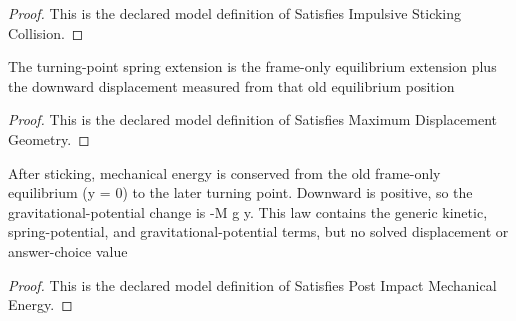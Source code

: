 \begin{proof}
  This is the declared model definition of Satisfies Impulsive Sticking Collision.
\end{proof}
\begin{definition}
  \label{def:physics:phyx-mini-0765:phyxminiproblems-problemphyxmini0765-satisfiesmaximumdisplacementgeometry}
  The turning-point spring extension is the frame-only equilibrium extension plus the downward displacement measured from that old equilibrium position
\end{definition}
\begin{proof}
  This is the declared model definition of Satisfies Maximum Displacement Geometry.
\end{proof}
\begin{definition}
  \label{def:physics:phyx-mini-0765:phyxminiproblems-problemphyxmini0765-satisfiespostimpactmechanicalenergy}
  After sticking, mechanical energy is conserved from the old frame-only equilibrium (y = 0) to the later turning point. Downward is positive, so the gravitational-potential change is -M g y. This law contains the generic kinetic, spring-potential, and gravitational-potential terms, but no solved displacement or answer-choice value
\end{definition}
\begin{proof}
  This is the declared model definition of Satisfies Post Impact Mechanical Energy.
\end{proof}

